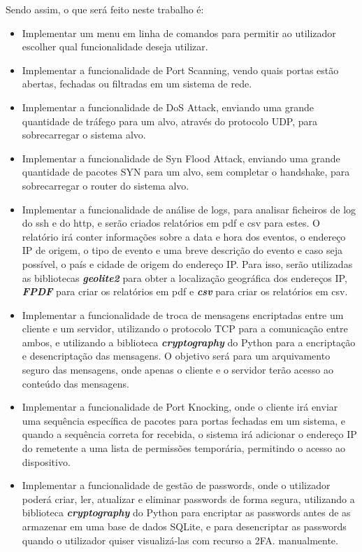 \documentclass[a4paper]{article}
\begin{document}
Sendo assim, o que será feito neste trabalho é:
\begin{itemize}
    \item Implementar um menu em linha de comandos para permitir ao utilizador escolher qual funcionalidade deseja utilizar.
    \item Implementar a funcionalidade de Port Scanning, vendo quais portas estão abertas, fechadas ou filtradas em um sistema de rede.
    \item Implementar a funcionalidade de DoS Attack, enviando uma grande quantidade de tráfego para um alvo, através do protocolo UDP, 
    para sobrecarregar o sistema alvo.
    \item Implementar a funcionalidade de Syn Flood Attack, enviando uma grande quantidade de pacotes SYN para um alvo, sem completar o 
    handshake, para sobrecarregar o router do sistema alvo.
    
    \item Implementar a funcionalidade de análise de logs, para analisar ficheiros de log do ssh e do http, e serão criados relatórios 
    em pdf e csv para estes. O relatório irá conter informações sobre a data e hora dos eventos, o endereço IP de origem, o tipo de evento e 
    uma breve descrição do evento e caso seja possível, o país e cidade de origem do endereço IP.  Para isso, serão utilizadas as bibliotecas 
    \textit{\textbf{geolite2}} para obter a localização geográfica dos endereços IP, \textit{\textbf{FPDF}} para criar os relatórios em pdf e 
    \textit{\textbf{csv}} para criar os relatórios em csv.
    \item Implementar a funcionalidade de troca de mensagens encriptadas entre um cliente e um servidor, utilizando o protocolo TCP para a 
    comunicação entre ambos, e utilizando a biblioteca \textit{\textbf{cryptography}} do Python para a encriptação e desencriptação das 
    mensagens. O objetivo será para um arquivamento seguro das mensagens, onde apenas o cliente e o servidor terão acesso ao conteúdo das 
    mensagens.
    \newpage
    \item Implementar a funcionalidade de Port Knocking, onde o cliente irá enviar uma sequência específica de pacotes para portas fechadas em um 
    sistema, e quando a sequência correta for recebida, o sistema irá adicionar o endereço IP do remetente a uma lista de permissões temporária, 
    permitindo o acesso ao dispositivo.
    \item Implementar a funcionalidade de gestão de passwords, onde o utilizador poderá criar, ler, atualizar e eliminar passwords de 
    forma segura, utilizando a biblioteca \textit{\textbf{cryptography}} do Python para encriptar as passwords antes de as armazenar em 
    uma base de dados SQLite, e para desencriptar as passwords quando o utilizador quiser visualizá-las com recurso a 2FA.
    manualmente.
\end{itemize}
\end{document}
